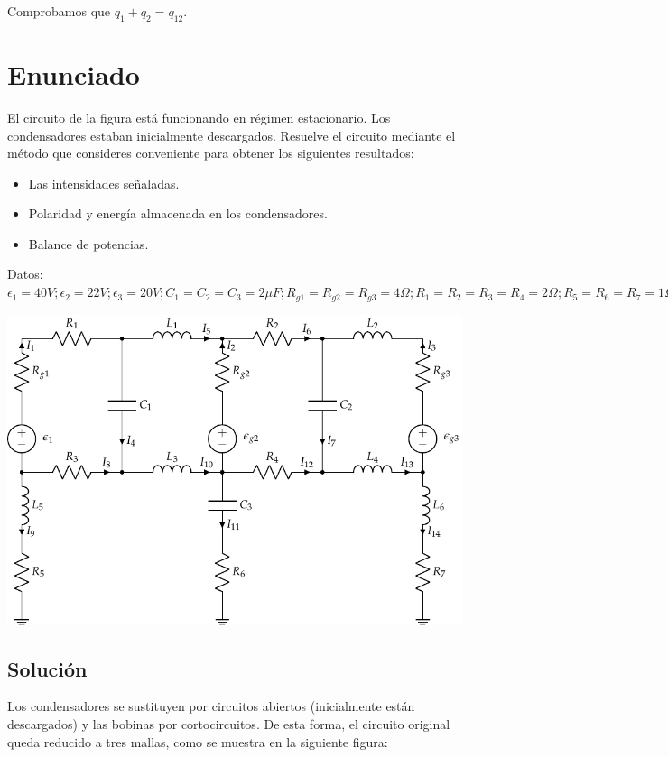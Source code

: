 Comprobamos que $q_1 + q_2 = q_{12}$.
\section{Enunciado}
El circuito de la figura está funcionando en régimen estacionario. Los
condensadores estaban inicialmente descargados. Resuelve el circuito
mediante el método que consideres conveniente para obtener los
siguientes resultados:
\begin{itemize}
\item Las intensidades señaladas.
\item Polaridad y energía almacenada en los condensadores.
\item Balance de potencias.
\end{itemize}
Datos:
$\epsilon_{1}={40}V; \epsilon_{2}={22}V; \epsilon_{3}={20}V;
C_{1}=C_{2}=C_{3}={2}{\mu F}; R_{g1}=R_{g2}=R_{g3}={4}{\Omega};
R_{1}=R_{2}=R_{3}=R_{4}={2}{\Omega}; R_{5}=R_{6}=R_{7}={1}{\Omega}$

\begin{center}
  \includegraphics{figuras/mallas_condensadores_bobinas.pdf}
\end{center}


\subsection*{Solución}
Los condensadores se sustituyen por circuitos abiertos (inicialmente
están descargados) y las bobinas por cortocircuitos. De esta forma, el
circuito original queda reducido a tres mallas, como se muestra en la
siguiente figura:

